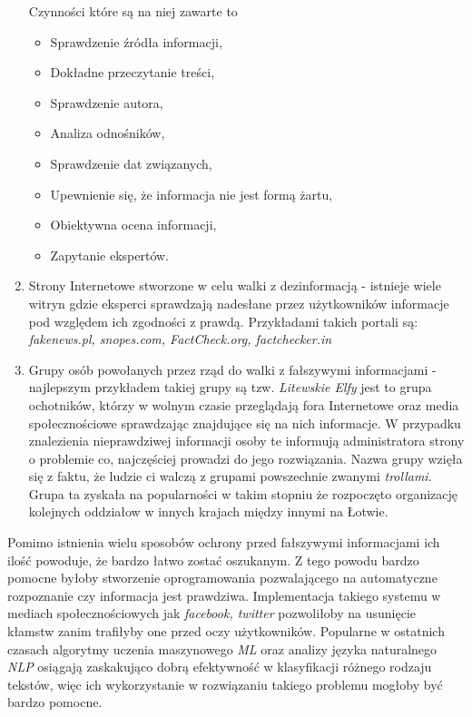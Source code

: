 \begin{enumerate}
    Czynności które są na niej zawarte to 
    \begin{itemize}
        \item Sprawdzenie źródła informacji,
        \item Dokładne przeczytanie treści,
        \item Sprawdzenie autora,
        \item Analiza odnośników,
        \item Sprawdzenie dat związanych,
        \item Upewnienie się, że informacja nie jest formą żartu,
        \item Obiektywna ocena informacji,
        \item Zapytanie ekspertów.
    \end{itemize}
    \item Strony Internetowe stworzone w celu walki z dezinformacją - istnieje
    wiele witryn gdzie eksperci sprawdzają nadesłane przez użytkowników informacje
    pod względem ich zgodności z prawdą.
    Przykładami takich portali są: \emph{fakenews.pl, snopes.com, FactCheck.org, factchecker.in} 
    \item Grupy osób powołanych przez rząd do walki z fałszywymi informacjami - najlepszym przykładem
    takiej grupy są tzw. \emph{Litewskie Elfy} jest to grupa ochotników, którzy w wolnym czasie przeglądają 
    fora Internetowe oraz media społecznościowe sprawdzając znajdujące się na nich informacje. W przypadku
    znalezienia nieprawdziwej informacji osoby te informują administratora strony o problemie co, najczęściej
    prowadzi do jego rozwiązania. Nazwa grupy wzięła się z faktu, że ludzie ci walczą z 
    grupami powszechnie zwanymi \emph{trollami}. Grupa ta zyskała na popularności
    w takim stopniu że rozpoczęto organizację kolejnych oddziałow w innych krajach
    między innymi na Łotwie.~\cite{Elves}
\end{enumerate}
Pomimo istnienia wielu sposobów ochrony przed fałszywymi informacjami ich ilość powoduje,
że bardzo łatwo zostać oszukanym. Z tego powodu bardzo pomocne byłoby stworzenie oprogramowania
pozwalającego na automatyczne rozpoznanie czy informacja jest prawdziwa.
Implementacja takiego systemu w mediach społecznościowych jak \emph{facebook, twitter} pozwoliłoby na usunięcie 
kłamstw zanim trafiłyby one przed oczy użytkowników. Popularne w ostatnich czasach algorytmy uczenia
maszynowego \emph{ML} oraz analizy języka naturalnego \emph{NLP} osiągają zaskakująco dobrą 
efektywność w klasyfikacji różnego rodzaju tekstów, więc ich wykorzystanie w rozwiązaniu takiego 
problemu mogłoby być bardzo pomocne.

